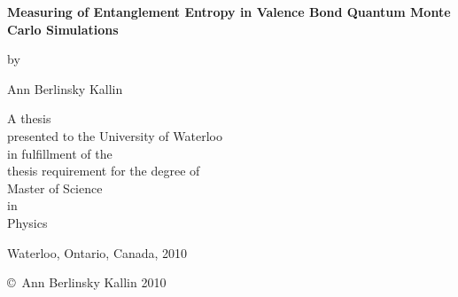 \pagestyle{empty}

\begin{titlepage}
        \begin{center}
        \vspace*{1.0cm}

        \Huge
        {\bf Measuring of Entanglement Entropy in Valence Bond Quantum Monte Carlo Simulations}

        \vspace*{1.0cm}

        \normalsize
        by \\

        \vspace*{1.0cm}

        \Large
        Ann Berlinsky Kallin \\

        \vspace*{3.0cm}

        \normalsize
        A thesis \\
        presented to the University of Waterloo \\ 
        in fulfillment of the \\
        thesis requirement for the degree of \\
        Master of Science \\
        in \\
        Physics \\

        \vspace*{2.0cm}

        Waterloo, Ontario, Canada, 2010 \\

        \vspace*{1.0cm}

        \copyright\ Ann Berlinsky Kallin 2010 \\
        \end{center}
\end{titlepage}

\pagestyle{plain}
\setcounter{page}{2}

